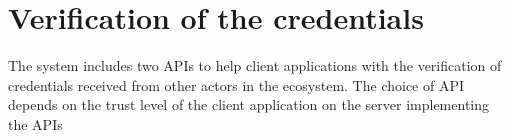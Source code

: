 \documentclass[a4paper,12pt,english,openany]{sphinxmanual}
\begin{document}
\begin{sphinxVerbatim}[commandchars=\\\{\}]
                             
                             
                         
                 \PYG{p}{[}
                \PYG{p}{],}
                 
\end{sphinxVerbatim}


\section{Verification of the credentials}
\label{\detokenize{privacycred:verification-of-the-credentials}}
\sphinxAtStartPar
The system includes two APIs to help client applications with the verification of credentials received from other actors in the ecosystem. The choice of API depends on the trust level of the client application on the server implementing the APIs
\end{document}
